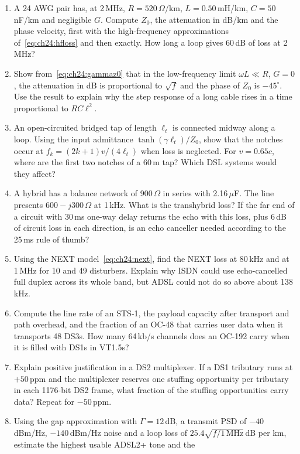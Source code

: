 \problems
\begin{enumerate}[label=\thechapter.\arabic*]
\item A 24 AWG pair has, at 2\,MHz, $R=520$\,$\Omega$/km, $L=0.50$\,mH/km, $C=50$\,nF/km and negligible $G$.
Compute $Z_0$, the attenuation in dB/km and the phase velocity, first with the high-frequency approximations
of~\eqref{eq:ch24:hfloss} and then exactly. How long a loop gives 60\,dB of loss at 2\,MHz?
\item Show from~\eqref{eq:ch24:gammaz0} that in the low-frequency limit $\omega L\ll R$, $G=0$, the
attenuation in dB is proportional to $\sqrt f$ and the phase of $Z_0$ is $-45^\circ$. Use the result to
explain why the step response of a long cable rises in a time proportional to $RC\ell^2$.
\item An open-circuited bridged tap of length $\ell_t$ is connected midway along a loop. Using the input
admittance $\tanh(\gamma\ell_t)/Z_0$, show that the notches occur at $f_k=(2k+1)v/(4\ell_t)$ when loss is
neglected. For $v=0.65c$, where are the first two notches of a 60\,m tap? Which DSL systems would they affect?
\item A hybrid has a balance network of 900\,$\Omega$ in series with 2.16\,$\mu$F. The line presents
$600-j300$\,$\Omega$ at 1\,kHz. What is the transhybrid loss? If the far end of a circuit with 30\,ms one-way
delay returns the echo with this loss, plus 6\,dB of circuit loss in each direction, is an echo canceller
needed according to the 25\,ms rule of thumb?
\item Using the NEXT model~\eqref{eq:ch24:next}, find the NEXT loss at 80\,kHz and at 1\,MHz for 10 and 49
disturbers. Explain why ISDN could use echo-cancelled full duplex across its whole band, but ADSL could not
do so above about 138\,kHz.
\item Compute the line rate of an STS-1, the payload capacity after transport and path overhead, and the
fraction of an OC-48 that carries user data when it transports 48 DS3s. How many 64\,kb/s channels does an
OC-192 carry when it is filled with DS1s in VT1.5s?
\item Explain positive justification in a DS2 multiplexer. If a DS1 tributary runs at $+50$\,ppm and the
multiplexer reserves one stuffing opportunity per tributary in each 1176-bit DS2 frame, what fraction of the
stuffing opportunities carry data? Repeat for $-50$\,ppm.
\item Using the gap approximation with $\Gamma=12$\,dB, a transmit PSD of $-40$\,dBm/Hz, $-140$\,dBm/Hz noise
and a loop loss of $25.4\sqrt{f/1\,\text{MHz}}$\,dB per km, estimate the highest usable ADSL2+ tone and the

\end{enumerate}

